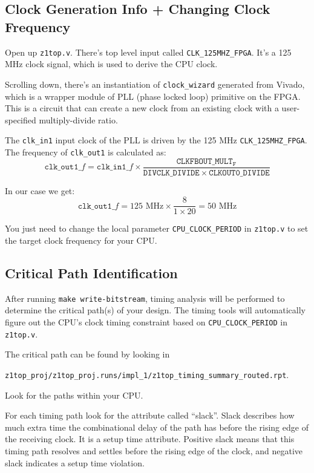 \documentclass[11pt]{article}
\begin{document}
\subsection{Clock Generation Info + Changing Clock Frequency}
Open up \verb|z1top.v|.
There's top level input called \verb|CLK_125MHZ_FPGA|.
It's a 125 MHz clock signal, which is used to derive the CPU clock.

Scrolling down, there's an instantiation of \verb|clock_wizard| generated from Vivado, which is a wrapper module of PLL (phase locked loop) primitive on the FPGA.
This is a circuit that can create a new clock from an existing clock with a user-specified multiply-divide ratio.

The \verb|clk_in1| input clock of the PLL is driven by the 125 MHz \verb|CLK_125MHZ_FPGA|.
The frequency of \verb|clk_out1| is calculated as:
\begin{equation*}
  \mathtt{clk\_out1}\_f = \mathtt{clk\_in1}\_f \times \frac{\mathtt{CLKFBOUT\_MULT_F}}{\mathtt{DIVCLK\_DIVIDE} \times \mathtt{CLKOUT0\_DIVIDE}}
\end{equation*}

In our case we get:
\begin{equation*}
  \mathtt{clk\_out1}\_f = 125 \text{ MHz} \times \frac{8}{1 \times 20} = 50 \text{ MHz}
\end{equation*}

You just need to change the local parameter \verb|CPU_CLOCK_PERIOD| in \verb|z1top.v| to set the target clock frequency for your CPU.

\subsection{Critical Path Identification}
After running \verb|make write-bitstream|, timing analysis will be performed to determine the critical path(s) of your design.
The timing tools will automatically figure out the CPU's clock timing constraint based on \verb|CPU_CLOCK_PERIOD| in \verb|z1top.v|.

The critical path can be found by looking in

\verb|z1top_proj/z1top_proj.runs/impl_1/z1top_timing_summary_routed.rpt|.

Look for the paths within your CPU.

For each timing path look for the attribute called ``slack''.
Slack describes how much extra time the combinational delay of the path has before the rising edge of the receiving clock.
It is a setup time attribute.
Positive slack means that this timing path resolves and settles before the rising edge of the clock, and negative slack indicates a setup time violation.
\end{document}
